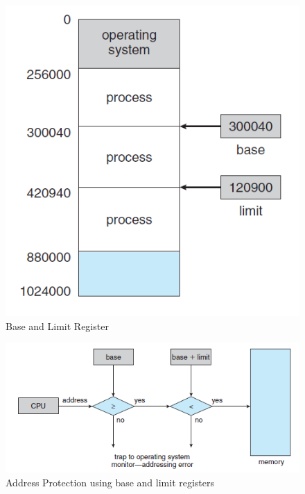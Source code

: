 \documentclass{article}
\theoremstyle{plain}
\theoremstyle{definition}
\begin{document}
\begin{figure}[!h]
    \centering
    \includegraphics[scale=0.5]{os1.png}
    \caption{Base and Limit Register}
    \label{fig:my_label}
\end{figure}

\begin{figure}[!ht]
    \centering
    \includegraphics{os3.png}
    \caption{Address Protection using base and limit registers}
    \label{fig:my_label_1}
\end{figure}
\end{document}
